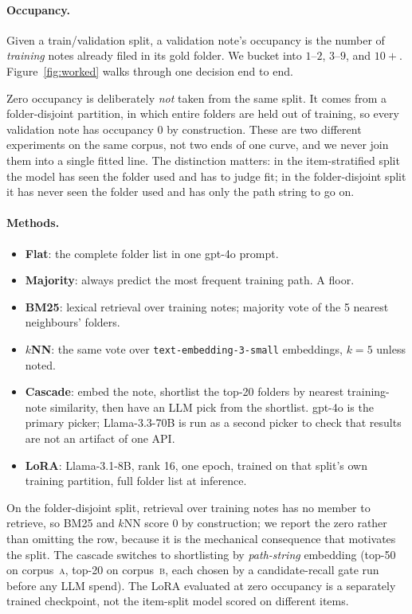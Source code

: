\documentclass[11pt]{article}
\newcommand{\corpA}{\textsc{a}}
\newcommand{\corpB}{\textsc{b}}
\begin{document}
\paragraph{Occupancy.}
Given a train/validation split, a validation note's occupancy is the number of \emph{training} notes already filed in its gold folder.
We bucket into $1$--$2$, $3$--$9$, and $10{+}$.
Figure~\ref{fig:worked} walks through one decision end to end.

Zero occupancy is deliberately \emph{not} taken from the same split.
It comes from a folder-disjoint partition, in which entire folders are held out of training, so every validation note has occupancy $0$ by construction.
These are two different experiments on the same corpus, not two ends of one curve, and we never join them into a single fitted line.
The distinction matters: in the item-stratified split the model has seen the folder used and has to judge fit; in the folder-disjoint split it has never seen the folder used and has only the path string to go on.

\paragraph{Methods.}
\begin{itemize}[itemsep=1pt,topsep=2pt,leftmargin=*]
  \item \textbf{Flat}: the complete folder list in one gpt-4o prompt.
  \item \textbf{Majority}: always predict the most frequent training path. A floor.
  \item \textbf{BM25}: lexical retrieval over training notes; majority vote of the 5 nearest neighbours' folders.
  \item \textbf{$k$NN}: the same vote over \texttt{text-embedding-3-small} embeddings, $k{=}5$ unless noted.
  \item \textbf{Cascade}: embed the note, shortlist the top-20 folders by nearest training-note similarity, then have an LLM pick from the shortlist. gpt-4o is the primary picker; Llama-3.3-70B is run as a second picker to check that results are not an artifact of one API.
  \item \textbf{LoRA}: Llama-3.1-8B, rank 16, one epoch, trained on that split's own training partition, full folder list at inference.
\end{itemize}

On the folder-disjoint split, retrieval over training notes has no member to retrieve, so BM25 and $k$NN score $0$ by construction; we report the zero rather than omitting the row, because it is the mechanical consequence that motivates the split.
The cascade switches to shortlisting by \emph{path-string} embedding (top-50 on corpus~\corpA{}, top-20 on corpus~\corpB{}, each chosen by a candidate-recall gate run before any LLM spend).
The LoRA evaluated at zero occupancy is a separately trained checkpoint, not the item-split model scored on different items.
\end{document}
